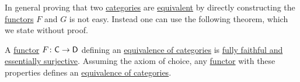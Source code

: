 \documentclass[../../main]{subfiles}
\begin{document}
In general proving that two \hyperref[def:category]{categories} are \hyperref[def:equivalent-categories]{equivalent} by directly constructing the \hyperref[def:functor]{functors} \(F\) and \(G\) is not easy.
Instead one can use the following theorem, which we state without proof.

\begin{theorem}\label{thm:equivalent-categories-characterization}
  A \hyperref[def:functor]{functor} \(F\colon \mathsf{C} \to \mathsf{D}\) defining an \hyperref[def:equivalent-categories]{equivalence of categories} is \hyperref[def:functor-types]{fully faithful and essentially surjective}.
  Assuming the axiom of choice, any \hyperref[def:functor]{functor} with these properties defines an  \hyperref[def:equivalent-categories]{equivalence of categories}.
\end{theorem}
\end{document}
